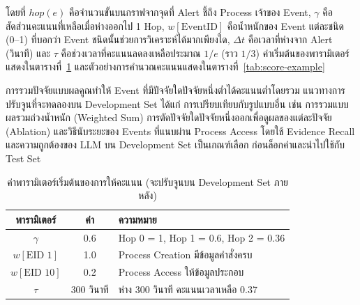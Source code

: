 \noindent
โดยที่ $hop(e)$ คือจำนวนขั้นบนกราฟจากจุดที่ Alert ชี้ถึง Process เจ้าของ Event,
$\gamma$ คือสัดส่วนคะแนนที่เหลือเมื่อห่างออกไป 1 Hop,
$w[\mathrm{EventID}]$ คือน้ำหนักของ Event แต่ละชนิด (0--1) ที่บอกว่า Event ชนิดนั้นช่วยการวิเคราะห์ได้มากเพียงใด,
$\Delta t$ คือเวลาที่ห่างจาก Alert (วินาที) และ $\tau$ คือช่วงเวลาที่คะแนนลดลงเหลือประมาณ $1/e$ (ราว $1/3$)
ค่าเริ่มต้นของพารามิเตอร์แสดงในตารางที่~\ref{tab:score-param}
และตัวอย่างการคำนวณคะแนนแสดงในตารางที่~\ref{tab:score-example}

การรวมปัจจัยแบบผลคูณทำให้ Event ที่มีปัจจัยใดปัจจัยหนึ่งต่ำได้คะแนนต่ำโดยรวม
แนวทางการปรับจูนที่จะทดลองบน Development Set ได้แก่ การเปรียบเทียบกับรูปแบบอื่น
เช่น การรวมแบบผลรวมถ่วงน้ำหนัก (Weighted Sum) การตัดปัจจัยใดปัจจัยหนึ่งออกเพื่อดูผลของแต่ละปัจจัย (Ablation)
และวิธีนับระยะของ Events ที่แนบผ่าน Process Access
โดยใช้ Evidence Recall และความถูกต้องของ LLM บน Development Set เป็นเกณฑ์เลือก
ก่อนล็อกค่าและนำไปใช้กับ Test Set

\begin{table}[ht]
  \centering
  \caption{ค่าพารามิเตอร์เริ่มต้นของการให้คะแนน (จะปรับจูนบน Development Set ภายหลัง)}
  \label{tab:score-param}
  \begin{tabular}{|c|c|l|}
    \hline
    \textbf{พารามิเตอร์} & \textbf{ค่า} & \textbf{ความหมาย} \\ \hline
    $\gamma$ & 0.6 & Hop 0 = 1, Hop 1 = 0.6, Hop 2 = 0.36 \\ \hline
    $w[\text{EID 1}]$ & 1.0 & Process Creation มีข้อมูลคำสั่งครบ \\ \hline
    $w[\text{EID 10}]$ & 0.2 & Process Access ให้ข้อมูลประกอบ \\ \hline
    $\tau$ & 300 วินาที & ห่าง 300 วินาที คะแนนเวลาเหลือ 0.37 \\ \hline
  \end{tabular}
\end{table}

